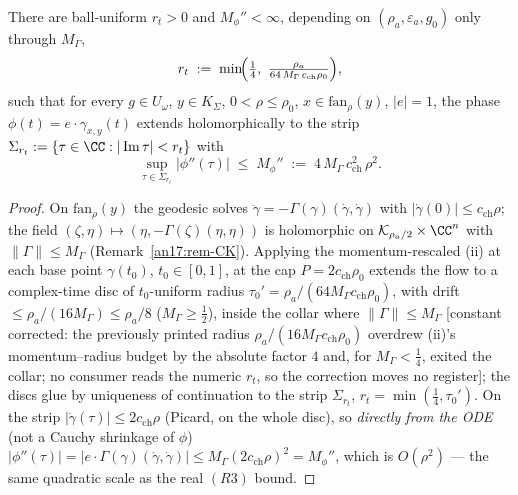 \begin{proposition}
\label{an17:prop-strip}
There are ball-uniform $r_t>0$ and $M_\phi''<\infty$, depending on
$(\rho_a,\varepsilon_a,g_0)$ only through $M_\Gamma$,
\begin{equation}\label{an17:eq-rt}
 r_t\;:=\;\min\!\Bigl(\tfrac14,\ \tfrac{\rho_a}{64\,M_\Gamma\,c_{\mathrm{ch}}
 \rho_0}\Bigr),
\end{equation}
such that for every $g\in U_\omega$, $y\in K_\Sigma$, $0<\rho\le\rho_0$, $x\in
\mathrm{fan}_\rho(y)$, $|e|=1$, the phase $\phi(t)=e\cdot\gamma_{x,y}(t)$ extends
holomorphically to the strip $\Sigma_{r_t}:=\{\tau\in\CC:|\operatorname{Im}\tau|
<r_t\}$ with
\begin{equation}\label{an17:eq-Mphi}
 \sup_{\tau\in\Sigma_{r_t}}|\phi''(\tau)|\;\le\;M_\phi''\;:=\;4\,M_\Gamma\,
 c_{\mathrm{ch}}^2\,\rho^2 .
\end{equation}
\end{proposition}
\begin{proof}
On $\mathrm{fan}_\rho(y)$ the geodesic solves $\ddot\gamma=-\Gamma(\gamma)
(\dot\gamma,\dot\gamma)$ with $|\dot\gamma(0)|\le c_{\mathrm{ch}}\rho$; the field
$(\zeta,\eta)\mapsto(\eta,-\Gamma(\zeta)(\eta,\eta))$ is holomorphic on $\mathcal
K_{\rho_a/2}\times\CC^n$ with $\|\Gamma\|\le M_\Gamma$
(Remark~\ref{an17:rem-CK}). Applying the momentum-rescaled (ii) at each base
point $\gamma(t_0)$, $t_0\in[0,1]$, at the cap $P=2c_{\mathrm{ch}}\rho_0$ extends
the flow to a complex-time disc of $t_0$-uniform radius
$\tau_0'=\rho_a/(64M_\Gamma c_{\mathrm{ch}}\rho_0)$, with drift
$\le\rho_a/(16M_\Gamma)\le\rho_a/8$ ($M_\Gamma\ge\tfrac12$), inside the collar
where $\|\Gamma\|\le M_\Gamma$ \textup{[constant corrected: the previously
printed radius $\rho_a/(16M_\Gamma c_{\mathrm{ch}}\rho_0)$ overdrew (ii)'s
momentum--radius budget by the absolute factor $4$ and, for $M_\Gamma<\tfrac14$,
exited the collar; no consumer reads the numeric $r_t$, so the correction moves
no register]}; the discs glue by uniqueness of continuation to the strip
$\Sigma_{r_t}$, $r_t=\min(\tfrac14,\tau_0')$. On the strip $|\dot\gamma(\tau)|\le
2c_{\mathrm{ch}}\rho$ (Picard, on the whole disc), so \emph{directly from the ODE}
(not a Cauchy shrinkage of $\phi$) $|\phi''(\tau)|=|e\cdot\Gamma(\gamma)(\dot
\gamma,\dot\gamma)|\le M_\Gamma(2c_{\mathrm{ch}}\rho)^2=M_\phi''$, which is
$O(\rho^2)$ --- the same quadratic scale as the real $(R3)$ bound.
\end{proof}

